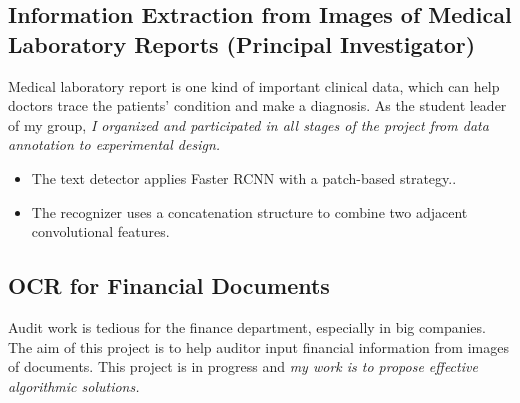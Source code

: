 \documentclass[12pt,letterpaper]{report}
\newcommand{\listitemspace}{0.15em}%
\newenvironment{desp}
{\begin{list}{}{\setlength{\leftmargin}{0em}
			\setlength{\parskip}{0em}
			\setlength{\itemsep}{\listitemspace}
			\setlength{\parsep}{\listitemspace}}}
	{\end{list}}
\begin{document}
	\subsection*{Information Extraction from Images of Medical Laboratory Reports (Principal Investigator)}

	\begin{desp}

		\item Medical laboratory report is one kind of important clinical data, which can help doctors trace the patients’ condition and make a diagnosis. As the student leader of my group, \textit{I organized and participated in all stages of the project from data annotation to experimental design.}
		\begin{itemize}
			\item The text detector applies Faster RCNN with a patch-based strategy..
			\item The recognizer uses a concatenation structure to combine two adjacent convolutional features.
	  \end{itemize}


	\end{desp}

  \subsection*{OCR for Financial Documents}
	\begin{desp}

		\item Audit work is tedious for the finance department, especially in big companies. The aim of this project is to help auditor input financial information from images of documents. This project is in progress and \textit{my work is to propose effective algorithmic solutions.}
	\end{desp}
\end{document}
